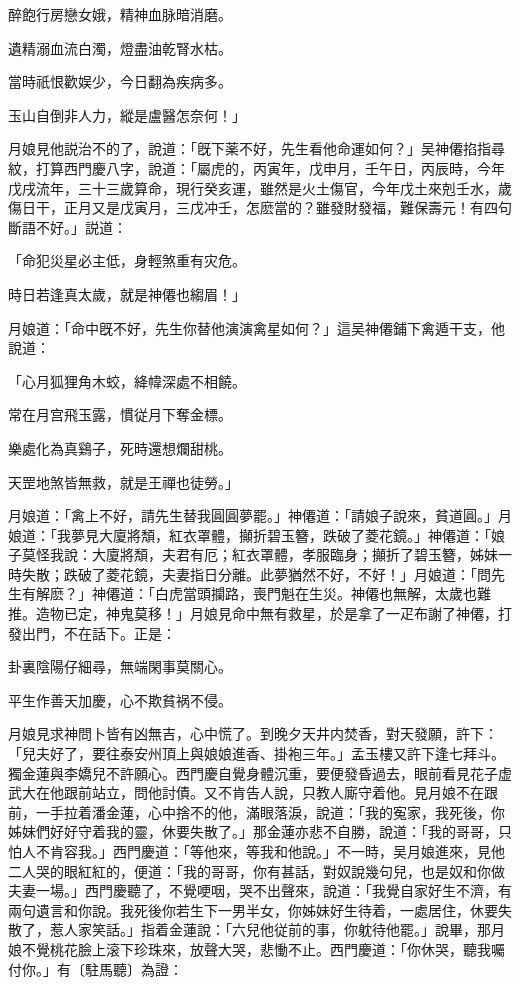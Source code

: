 \begin{myquote}
醉飽行房戀女娥，精神血脉暗消磨。

遺精溺血流白濁，燈盡油乾腎水枯。

當時祇恨歡娱少，今日翻為疾病多。

玉山自倒非人力，縱是盧醫怎奈何！」
\end{myquote}

月娘見他説治不的了，說道：「旣下薬不好，先生看他命運如何？」吴神僊掐指尋紋，打算西門慶八字，說道：「屬虎的，丙寅年，戊申月，壬午日，丙辰時，今年戊戌流年，三十三歲算命，現行癸亥運，雖然是火土傷官，今年戊土來剋壬水，歲傷日干，正月又是戊寅月，三戊冲壬，怎麽當的？雖發財發福，難保壽元！有四句斷語不好。」説道：

\begin{myquote}
「命犯災星必主低，身輕煞重有灾危。

時日若逢真太歲，就是神僊也縐眉！」
\end{myquote}

月娘道：「命中旣不好，先生你替他演演禽星如何？」這吴神僊鋪下禽遁干支，他說道：

\begin{myquote}
「心月狐狸角木蛟，絳幃深處不相饒。

常在月宫飛玉露，慣従月下奪金標。

樂處化為真鷄子，死時還想爛甜桃。

天罡地煞皆無救，就是王禪也徒勞。」
\end{myquote}

月娘道：「禽上不好，請先生替我圓圓夢罷。」神僊道：「請娘子說來，貧道圓。」月娘道：「我夢見大廈將頽，紅衣罩體，攧折碧玉簪，跌破了菱花鏡。」神僊道：「娘子莫怪我說：大廈將頽，夫君有厄；紅衣罩體，孝服臨身；攧折了碧玉簪，姊妹一時失散；跌破了菱花鏡，夫妻指日分離。此夢猶然不好，不好！」月娘道：「問先生有解麽？」神僊道：「白虎當頭攔路，喪門魁在生災。神僊也無解，太歲也難推。造物已定，神鬼莫移！」月娘見命中無有救星，於是拿了一疋布謝了神僊，打發出門，不在話下。正是：

\begin{myquote}
卦裏陰陽仔細尋，無端閑事莫關心。

平生作善天加慶，心不欺貧祸不侵。
\end{myquote}

月娘見求神問卜皆有凶無吉，心中慌了。到晚夕天井内焚香，對天發願，許下：「兒夫好了，要往泰安州頂上與娘娘進香、掛袍三年。」孟玉樓又許下逢七拜斗。獨金蓮與李嬌兒不許願心。西門慶自覺身體沉重，要便發昏過去，眼前看見花子虚武大在他跟前站立，問他討債。又不肯告人說，只教人廝守着他。見月娘不在跟前，一手拉着潘金蓮，心中捨不的他，滿眼落淚，說道：「我的寃家，我死後，你姊妹們好好守着我的靈，休要失散了。」那金蓮亦悲不自勝，說道：「我的哥哥，只怕人不肯容我。」西門慶道：「等他來，等我和他說。」不一時，吴月娘進來，見他二人哭的眼紅紅的，便道：「我的哥哥，你有甚話，對奴說幾句兒，也是奴和你做夫妻一場。」西門慶聽了，不覺哽咽，哭不出聲來，說道：「我覺自家好生不濟，有兩句遺言和你說。我死後你若生下一男半女，你姊妹好生待着，一處居住，休要失散了，惹人家笑話。」指着金蓮說：「六兒他従前的事，你躭待他罷。」說畢，那月娘不覺桃花臉上滚下珍珠來，放聲大哭，悲慟不止。西門慶道：「你休哭，聽我囑付你。」有〔駐馬聽〕為證：

